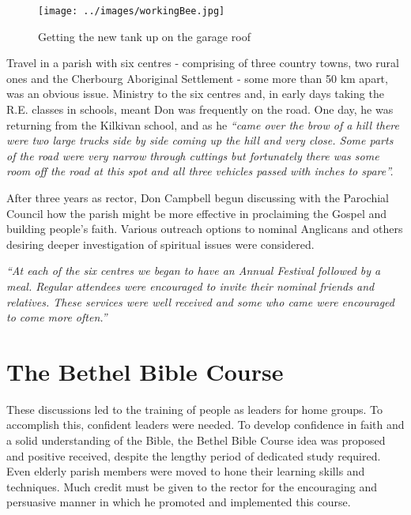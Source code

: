 \begin{figure}[!htb]
\begin{center}
\texttt{[image: ../images/workingBee.jpg]}
\caption{Getting the new tank up on the garage roof}
\end{center}
\end{figure}




Travel in a parish with six centres - comprising of three country towns, two rural ones and the Cherbourg Aboriginal Settlement - some more than 50 km apart, was an obvious issue. Ministry to the six centres and, in early days taking the R.E. classes in schools, meant Don was frequently on the road. One day, he was returning from the Kilkivan school, and as he \emph{``came over the brow of a hill there were two large trucks side by side coming up the hill and very close. Some parts of the road were very narrow through cuttings but fortunately there was some room off the road at this spot and all three vehicles passed with inches to spare''.}



After three years as rector, Don Campbell begun discussing with the Parochial Council how the parish might be more effective in proclaiming the Gospel and building people's faith. Various outreach options to nominal Anglicans and others desiring deeper investigation of spiritual issues were considered.



\emph{``At each of the six centres we began to have an Annual Festival followed by a meal. Regular attendees were encouraged to invite their nominal friends and relatives. These services were well received and some who came were encouraged to come more often.''}



\section{The Bethel Bible Course}



These discussions led to the training of people as leaders for home groups. To accomplish this, confident leaders were needed. To develop confidence in faith and a solid understanding of the Bible, the Bethel Bible Course idea was proposed and positive received, despite the lengthy period of dedicated study required. Even elderly parish members were moved to hone their learning skills and techniques. Much credit must be given to the rector for the encouraging and persuasive manner in which he promoted and implemented this course.



